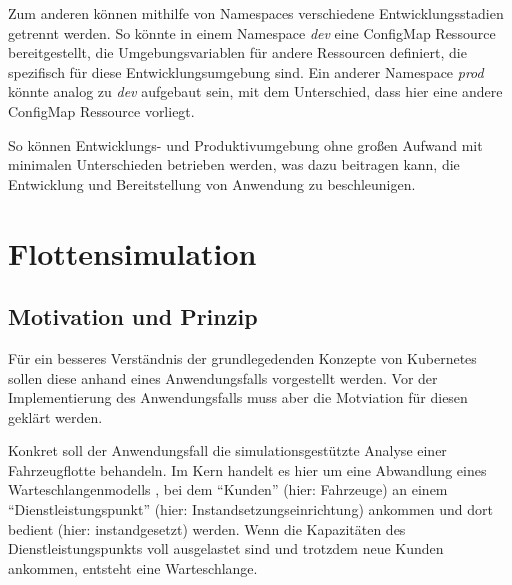 \documentclass[11pt,a4paper]{article}
\begin{document}
Zum anderen können mithilfe von Namespaces verschiedene Entwicklungsstadien getrennt werden.
So könnte in einem Namespace \emph{dev} eine ConfigMap Ressource bereitgestellt,
die Umgebungsvariablen für andere Ressourcen definiert, die spezifisch für diese 
Entwicklungsumgebung sind. Ein anderer Namespace \emph{prod} könnte analog zu \emph{dev}
aufgebaut sein, mit dem Unterschied, dass hier eine andere ConfigMap Ressource vorliegt.

So können Entwicklungs- und Produktivumgebung ohne großen Aufwand mit minimalen Unterschieden betrieben
werden, was dazu beitragen kann, die Entwicklung und Bereitstellung von Anwendung zu beschleunigen.
\cite{Schmeling_Dargatz_2022}



\section{Flottensimulation}

\subsection{Motivation und Prinzip}
Für ein besseres Verständnis der grundlegedenden Konzepte von Kubernetes sollen diese anhand eines
Anwendungsfalls vorgestellt werden.
Vor der Implementierung des Anwendungsfalls muss aber die Motviation für diesen geklärt werden.

Konkret soll der Anwendungsfall die simulationsgestützte Analyse einer Fahrzeugflotte behandeln.
Im Kern handelt es hier um eine Abwandlung eines Warteschlangenmodells \cite{Leonelli2021}, bei dem
``Kunden'' (hier: Fahrzeuge) an einem ``Dienstleistungspunkt'' (hier: Instandsetzungseinrichtung) ankommen 
und dort bedient (hier: instandgesetzt) werden.
Wenn die Kapazitäten des Dienstleistungspunkts voll ausgelastet sind und trotzdem neue Kunden ankommen, entsteht eine Warteschlange.
\end{document}

